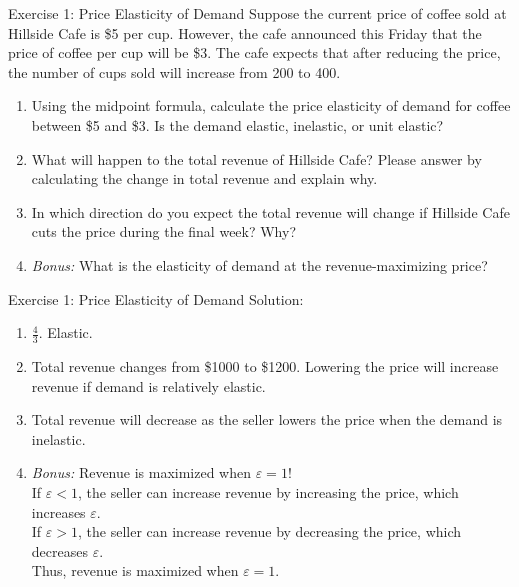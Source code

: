 \documentclass[9pt, handout]{beamer}
\begin{document}
\begin{frame}{Exercise 1: Price Elasticity of Demand}
    Suppose the current price of coffee sold at Hillside Cafe is \$5 per cup. However, the cafe announced this Friday that the price of coffee per cup will be \$3. The cafe expects that after reducing the price, the number of cups sold will increase from 200 to 400. 
    \begin{enumerate}
        \item Using the midpoint formula, calculate the price elasticity of demand for coffee between \$5 and \$3. Is the demand elastic, inelastic, or unit elastic?
        \item What will happen to the total revenue of Hillside Cafe? Please answer by calculating the change in total revenue and explain why.
        \item In which direction do you expect the total revenue will change if Hillside Cafe cuts the price during the final week? Why?
        \item \textit{Bonus:} What is the elasticity of demand at the revenue-maximizing price?
    \end{enumerate}
    \vspace{1.5in}
\end{frame}

\begin{frame}{Exercise 1: Price Elasticity of Demand}
    Solution: 
    \begin{enumerate}
        \item $\frac{4}{3}$. Elastic.  
        \item Total revenue changes from \$1000 to \$1200. Lowering the price will increase revenue if demand is relatively elastic. 
        \item Total revenue will decrease as the seller lowers the price when the demand is inelastic.
        \item \textit{Bonus:} Revenue is maximized when $\varepsilon = 1$! \\
        If $\varepsilon < 1$, the seller can increase revenue by increasing the price, which increases $\varepsilon$.\\
        If $\varepsilon > 1$, the seller can increase revenue by decreasing the price, which decreases $\varepsilon$.\\
        Thus, revenue is maximized when $\varepsilon = 1$.
    \end{enumerate}
\end{frame}
\end{document}
